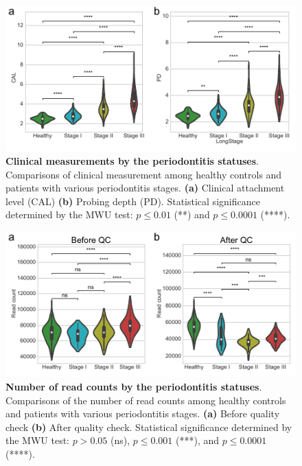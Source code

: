 \documentclass[11pt, a4paper, onecolumn, oneside]{report}
\begin{document}
            \begin{figure}[p]
                \centering
                \includegraphics[width=\linewidth]{Figures/Periodontitis/Figure_R02.pdf}
                \caption[Clinical measurements by the periodontitis statuses]{\textbf{Clinical measurements by the periodontitis statuses}. \\
                    Comparisons of clinical measurement among healthy controls and patients with various periodontitis stages. \textbf{(a)} Clinical attachment level (CAL) \textbf{(b)} Probing depth (PD). Statistical significance determined by the MWU test: $p \le 0.01$ (**) and $p \le 0.0001$ (****).}
                \label{fig:Periodontitis-clinical}
            \end{figure}
            \clearpage

            \begin{figure}[p]
                \centering
                \includegraphics[width=\linewidth]{Figures/Periodontitis/Figure_R03.pdf}
                \caption[Number of read counts by the periodontitis statuses]{\textbf{Number of read counts by the periodontitis statuses}. \\
                    Comparisons of the number of read counts among healthy controls and patients with various periodontitis stages. \textbf{(a)} Before quality check \textbf{(b)} After quality check. Statistical significance determined by the MWU test: $p > 0.05$ (ns), $p \le 0.001$ (***), and $p \le 0.0001$ (****).}
                \label{fig:Periodontitis-QC}
            \end{figure}
            \clearpage
\end{document}
